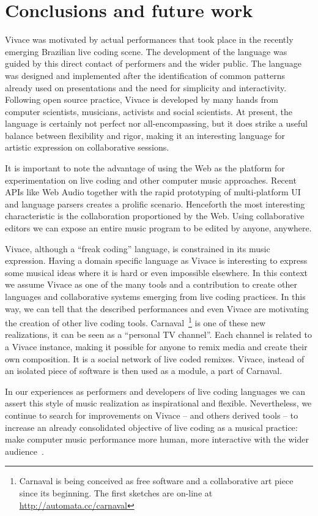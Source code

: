 \documentclass[12pt,times,twocolumn]{article}
\begin{document}
\section{Conclusions and future work}
Vivace was motivated by actual performances that took place in the
recently emerging Brazilian live coding scene. The development of the
language was guided by this direct contact of performers and the wider
public. The language was designed and implemented after the
identification of common patterns already used on
presentations and the need for simplicity and interactivity.
Following open source practice, Vivace is
developed by many hands from computer scientists, musicians, activists
and social scientists. At present, the language is certainly not perfect nor
all-encompassing, but it does strike a useful balance between
flexibility and rigor, making it an interesting language for artistic
expression on collaborative sessions.

It is important to note the advantage of using the Web as the platform
for experimentation on live coding and other computer music
approaches. Recent APIs like Web Audio together with the rapid
prototyping of multi-platform UI and language parsers creates a
prolific scenario. Henceforth the most interesting characteristic is
the collaboration proportioned by the Web. Using collaborative editors
we can expose an entire music program to be edited by anyone,
anywhere.

Vivace, although a ``freak coding'' language, is constrained in its
music expression. Having a domain specific language as Vivace is
interesting to express some musical ideas where it is hard or
even impossible elsewhere. In this context we assume Vivace as
one of the many tools and a contribution to create other languages and
collaborative systems emerging from live coding practices. In this
way, we can tell that the described performances and even Vivace are
motivating the creation of other live coding
tools. Carnaval~\footnote{Carnaval is being conceived as free software
  and a collaborative art piece since its beginning. The first
  sketches are on-line at \url{http://automata.cc/carnaval}} is one of
these new realizations, it can be seen as a ``personal TV
channel''. Each channel is related to a Vivace instance, making it
possible for anyone to remix media and create their own
composition. It is a social network of live coded remixes. Vivace,
instead of an isolated piece of software is then used as a module,
a part of Carnaval.

In our experiences as performers and developers of live coding
languages we can assert this style of music realization as
inspirational and flexible. Nevertheless, we continue to search for
improvements on Vivace -- and others derived tools -- to increase an
already consolidated objective of live coding as a musical practice:
make computer music performance more human, more interactive with the
wider audience~\cite{hum}.
\end{document}
